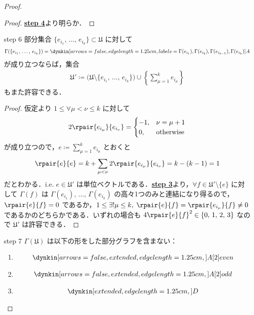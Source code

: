 \documentclass[rep_main]{subfiles}
\begin{document}
\begin{proof}
	\begin{proof}
		\hyperref[lem:classification-step-4]{\textsf{\textbf{step 4}}}より明らか．
	\end{proof}

	\begin{mylem}[label=lem:classification-step-6]{step 6}
		部分集合 $\{e_{i_1},\, \dots,\, e_{i_k}\} \subset \mathfrak{U}$ に対して
		\begin{align}
			\Gamma(\{e_{i_1},\, \dots,\, e_{i_k}\}) = \dynkin[arrows=false,edge length=1.25cm,labels={\Gamma(e_{i_1}),\Gamma(e_{i_2}),\Gamma(e_{i_{k-1}}),\Gamma(e_{i_k})}] A{}
		\end{align}
		が成り立つならば，集合
		\begin{align}
			\mathfrak{U}' \coloneqq \bigl(\mathfrak{U} \setminus \{e_{i_1},\, \dots,\, e_{i_k}\}\bigr) \cup \left\{ \sum_{\mu=1}^k e_{i_\mu} \right\} 
		\end{align}
		もまた許容できる．
	\end{mylem}
	
	\begin{proof}
		仮定より $1 \le \forall \mu < \nu \le k$ に対して
		\begin{align}
			2\rpair{e_{i_\mu}}{e_{i_\nu}}
			=
			\begin{cases}
				-1, &\nu = \mu+1 \\
				0, &\mathrm{otherwise}
			\end{cases}
		\end{align}
		が成り立つので，$e \coloneqq \sum_{\mu=1}^k e_{i_\mu}$ とおくと
		\begin{align}
			\rpair{e}{e} = k + \sum_{\mu < \nu} 2 \rpair{e_{i_\mu}}{e_{i_\nu}} = k - (k - 1) = 1
		\end{align}
		だとわかる．i.e. $e \in \mathfrak{U}'$ は単位ベクトルである．\hyperref[lem:classification-step-3]{\textsf{\textbf{step 3}}}より，$\forall f \in \mathfrak{U}' \setminus \{e\}$ に対して $\Gamma(f)$ は $\Gamma(e_{i_1}),\, \dots,\,\Gamma(e_{i_k})$ の高々1つのみと連結になり得るので，
		$\rpair{e}{f} = 0$ であるか，$1 \le \exists ! \mu \le k,\; \rpair{e}{f} = \rpair{e_{i_\mu}}{f} \neq 0$ であるかのどちらかである．いずれの場合も $4\rpair{e}{f}^2 \in \{0,\, 1,\, 2,\, 3\}$ なので $\mathfrak{U}'$ は許容できる．
	\end{proof}


	\begin{mylem}[label=lem:classification-step-7]{step 7}
		$\Gamma(\mathfrak{U})$ は以下の形をした部分グラフを含まない：
		\begin{enumerate}
			\item 
			\begin{align}
				\dynkin[arrows=false,extended,edge length=1.25cm,] A[2]{even}
			\end{align}
			\item 
			\begin{align}
				\dynkin[arrows=false,extended,edge length=1.25cm,] A[2]{odd}
			\end{align}
			\item \begin{align}
				\dynkin [extended,edge length=1.25cm,] D{}
			\end{align}
			

\end{enumerate}
\end{mylem}
\end{proof}
\end{document}
